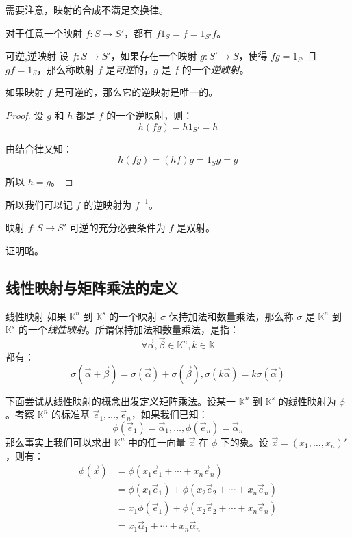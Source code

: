 需要注意，映射的合成不满足交换律。

\begin{theorem}
	对于任意一个映射 $f \colon S \to S'$，都有 $f 1_S = f = 1_{S'} f$。
\end{theorem}

\begin{definition}{可逆,逆映射}
	设 $f \colon S \to S'$，如果存在一个映射 $g \colon S' \to S$，使得 $fg = 1_{S'}$ 且 $gf = 1_S$，那么称映射 $f$ 是\emph{可逆}的，$g$ 是 $f$ 的一个\emph{逆映射}。
\end{definition}

\begin{theorem}
	如果映射 $f$ 是可逆的，那么它的逆映射是唯一的。
\end{theorem}

\begin{proof}
	设 $g$ 和 $h$ 都是 $f$ 的一个逆映射，则：
	$$
	h(fg) = h 1_{S'} = h
	$$

	由结合律又知：
	$$
	h(fg) = (hf)g = 1_S g = g
	$$

	所以 $h = g$。
\end{proof}

所以我们可以记 $f$ 的逆映射为 $f^{-1}$。

\begin{theorem}
	映射 $f \colon S \to S'$ 可逆的充分必要条件为 $f$ 是双射。
\end{theorem}


证明略。

\subsection{线性映射与矩阵乘法的定义}

\begin{definition}{线性映射}
	如果 $\mathbb K^n$ 到 $\mathbb K^s$ 的一个映射 $\sigma$ 保持加法和数量乘法，那么称 $\sigma$ 是 $\mathbb K^n$ 到 $\mathbb K^s$ 的一个\emph{线性映射}。所谓保持加法和数量乘法，是指：
	$$
	\forall \vec \alpha, \vec \beta \in \mathbb K^n, k \in \mathbb K
	$$
	都有：
	$$
	\sigma(\vec \alpha + \vec \beta) = \sigma(\vec \alpha) + \sigma(\vec \beta), \sigma(k \vec \alpha) = k \sigma (\vec \alpha)
	$$
\end{definition}

下面尝试从线性映射的概念出发定义矩阵乘法。设某一 $\mathbb K^n$ 到 $\mathbb K^s$ 的线性映射为 $\phi$。考察 $\mathbb K^n$ 的标准基 $\vec e_1, \ldots, \vec e_n$，如果我们已知：
$$
\phi(\vec e_1) = \vec \alpha_1, \ldots, \phi(\vec e_n) = \vec \alpha_n
$$
那么事实上我们可以求出 $\mathbb K^n$ 中的任一向量 $\vec x$ 在 $\phi$ 下的象。设 $\vec x = (x_1, \ldots, x_n)'$，则有：
$$
\begin{aligned}
	\phi(\vec x) &= \phi(x_1 \vec e_1 + \cdots + x_n \vec e_n)
	\\&=
	\phi(x_1 \vec e_1) + \phi(x_2 \vec e_2 + \cdots + x_n \vec e_n)
	\\&=
	x_1 \phi(\vec e_1) + \phi(x_2 \vec e_2 + \cdots + x_n \vec e_n)
	\\&=
	x_1 \vec \alpha_1 + \cdots + x_n \vec \alpha_n
\end{aligned}
$$

